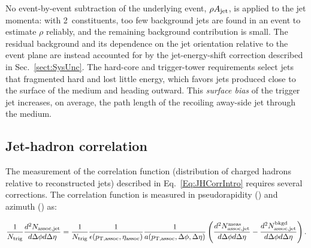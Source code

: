 No event-by-event subtraction of the underlying event, $\rho A_{\rm jet}$, is applied to the jet momenta: with 2~\GeVc constituents, too few background \kt jets are found in an event to estimate $\rho$ reliably, and the remaining background contribution is small.
%
The residual background and its dependence on the jet orientation relative to the event plane are instead accounted for by the jet-energy-shift correction described in Sec.~\ref{sect:SysUnc}.
%
The hard-core and trigger-tower requirements select jets that fragmented hard and lost little energy, which favors jets produced close to the surface of the medium and heading outward.
%
This \emph{surface bias} of the trigger jet increases, on average, the path length of the recoiling away-side jet through the medium.

\subsection{Jet-hadron correlation} \label{sect:Correlations}
The measurement of the correlation function (distribution of charged hadrons relative to reconstructed jets) described in Eq.~\ref{Eq:JHCorrIntro} requires several corrections.  The correlation function is measured in pseudorapidity (\deta) and azimuth (\dphi) as: 

\begin{equation}
	\frac{1}{N_{\rm trig}} \frac{d^2N_{\rm assoc,jet}}{d\Delta\phi d\Delta\eta} = \frac{1}{N_{\rm trig}} \frac{1}{\epsilon(p_{\mathrm{T, assoc}}, \eta_{\rm assoc})} \frac{1}{a(p_{\mathrm{T, assoc}}, \text{\ensuremath{\Delta\phi}}, \text{\ensuremath{\Delta\eta}})}\left(\frac{d^2 N^{\rm meas}_{\rm assoc,jet}}{d\Delta\phi d\Delta\eta} - \frac{d^2 N^{\rm bkgd}_{\rm assoc,jet}}{d\Delta\phi d\Delta\eta}\right) .
	\label{Eqtn:CorrFunction}
\end{equation}

